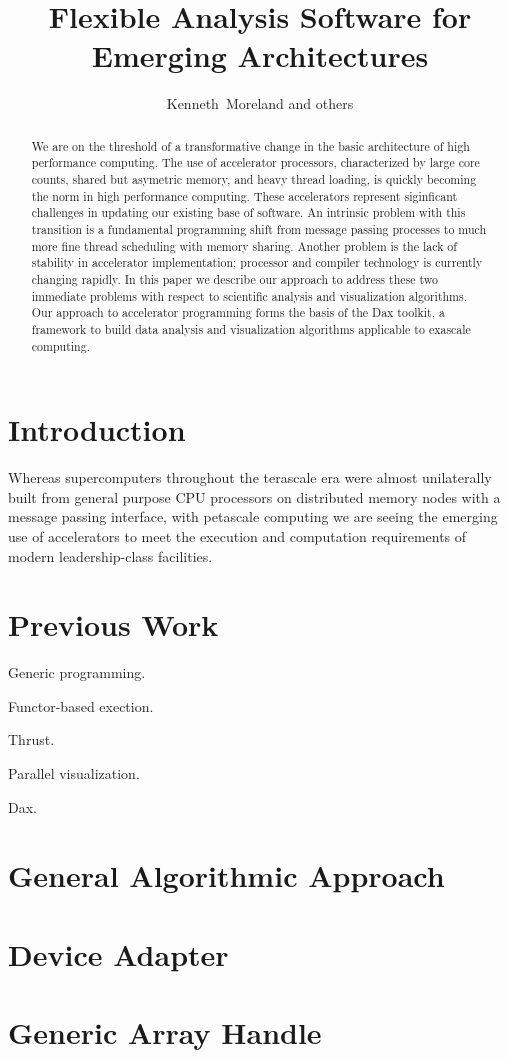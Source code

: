 \documentclass[twocolumn]{article}
\title{Flexible Analysis Software for Emerging Architectures}
\author{Kenneth~Moreland and others}
\begin{document}
\sloppy

\maketitle

\begin{abstract}
  We are on the threshold of a transformative change in the basic
  architecture of high performance computing.  The use of accelerator
  processors, characterized by large core counts, shared but asymetric
  memory, and heavy thread loading, is quickly becoming the norm in high
  performance computing.  These accelerators represent siginficant
  challenges in updating our existing base of software.  An intrinsic
  problem with this transition is a fundamental programming shift from
  message passing processes to much more fine thread scheduling with memory
  sharing.  Another problem is the lack of stability in accelerator
  implementation; processor and compiler technology is currently changing
  rapidly.  In this paper we describe our approach to address these two
  immediate problems with respect to scientific analysis and visualization
  algorithms.  Our approach to accelerator programming forms the basis of
  the Dax toolkit, a framework to build data analysis and visualization
  algorithms applicable to exascale computing.
\end{abstract}

\section{Introduction}
\label{sec:Introduction}

Whereas supercomputers throughout the terascale era were almost
unilaterally built from general purpose CPU processors on distributed
memory nodes with a message passing interface, with petascale computing we
are seeing the emerging use of accelerators to meet the execution and
computation requirements of modern leadership-class facilities.

\section{Previous Work}

Generic programming.

Functor-based exection.

Thrust.

Parallel visualization.

Dax.

\section{General Algorithmic Approach}

\section{Device Adapter}

\section{Generic Array Handle}
\end{document}
